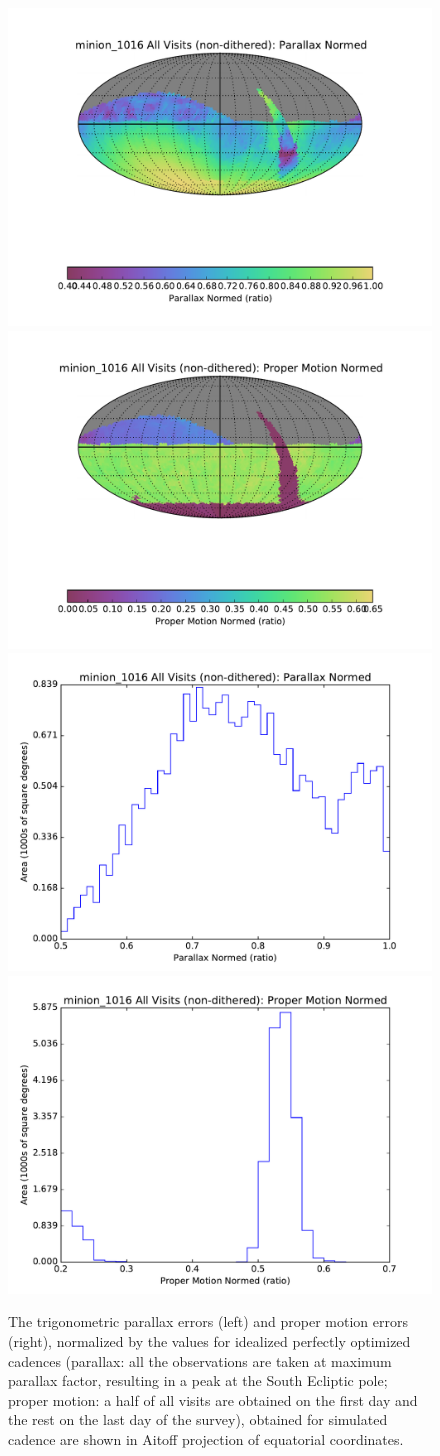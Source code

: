 \begin{figure}[t!]
\vskip -0.0in
\includegraphics[angle=0,width=0.49\hsize,clip]{figs/cadence/minion_1016_Parallax_Normed_All_Visits_non-dithered_HEAL_SkyMap.pdf}
\includegraphics[angle=0,width=0.49\hsize,clip]{figs/cadence/minion_1016_Proper_Motion_Normed_All_Visits_non-dithered_HEAL_SkyMap.pdf}
\includegraphics[angle=0,width=0.49\hsize,clip]{figs/cadence/minion_1016_Parallax_Normed_All_Visits_non-dithered_HEAL_Histogram.pdf}
\includegraphics[angle=0,width=0.49\hsize,clip]{figs/cadence/minion_1016_Proper_Motion_Normed_All_Visits_non-dithered_HEAL_Histogram.pdf}
\vskip -0.1in
\caption{The trigonometric parallax errors (left) and proper motion errors (right), normalized
by the values for idealized perfectly optimized cadences (parallax: all the observations are taken
at maximum parallax factor, resulting in a peak at the South Ecliptic pole; proper motion:
a half of all visits are obtained on the first day and the rest on the last day of the survey),
obtained for simulated cadence  are shown in Aitoff projection of equatorial
coordinates.}
\label{fig:parapmenigma}
\end{figure}


